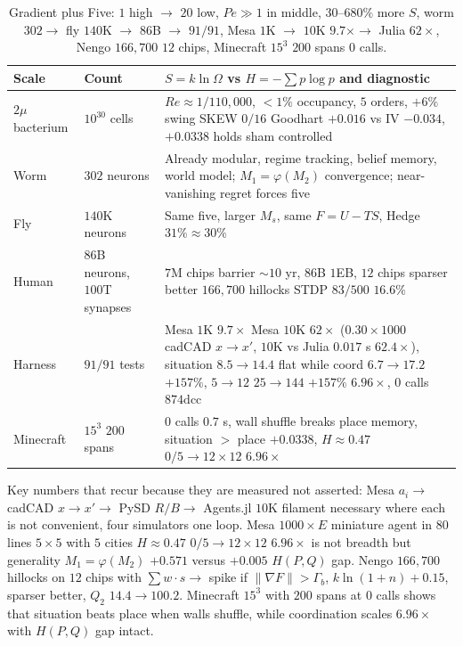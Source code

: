 \documentclass[11pt,a4paper]{article}
\begin{document}
\begin{table}[h]
\centering
\caption{Gradient plus Five: $1$ high $\to$ $20$ low, $Pe \gg 1$ in middle, $30$--$680\%$ more $S$, worm $302 \to$ fly $140$K $\to$ $86$B $\to$ $91/91$, Mesa $1$K $\to$ $10$K $9.7\times \to$ Julia $62\times$, Nengo $166{,}700$ $12$ chips, Minecraft $15^3$ $200$ spans $0$ calls.}
\label{tab:gradient}
\small
\begin{tabular}{p{4.2cm} p{3.2cm} p{6.5cm}}
\toprule
Scale & Count & $S = k\ln\Omega$ vs $H=-\sum p\log p$ and diagnostic \\
\midrule
$2\mu$ bacterium & $10^{30}$ cells & $Re \approx 1/110{,}000$, $<1\%$ occupancy, $5$ orders, $+6\%$ swing SKEW $0/16$ Goodhart $+0.016$ vs IV $-0.034$, $+0.0338$ holds sham controlled \\
\midrule
Worm & $302$ neurons & Already modular, regime tracking, belief memory, world model; $M_1=\varphi(M_2)$ convergence; near-vanishing regret forces five \\
\midrule
Fly & $140$K neurons & Same five, larger $M_s$, same $F=U-TS$, Hedge $31\%\approx 30\%$ \\
\midrule
Human & $86$B neurons, $100$T synapses & $7$M chips barrier $\sim 10$ yr, $86$B $1$EB, $12$ chips sparser better $166{,}700$ hillocks STDP $83/500$ $16.6\%$ \\
\midrule
Harness & $91/91$ tests & Mesa $1$K $9.7\times$ Mesa $10$K $62\times$ ($0.30\times1000$ cadCAD $x\to x'$, $10$K vs Julia $0.017$ s $62.4\times$), situation $8.5\to14.4$ flat while coord $6.7\to17.2$ $+157\%$, $5\to12$ $25\to144$ $+157\%$ $6.96\times$, $0$ calls $874\text{dcc}$ \\
\midrule
Minecraft & $15^3$ $200$ spans & $0$ calls $0.7$ s, wall shuffle breaks place memory, situation $>$ place $+0.0338$, $H\approx0.47$ $0/5\to12\times12$ $6.96\times$ \\
\bottomrule
\end{tabular}
\end{table}

Key numbers that recur because they are measured not asserted: Mesa $a_i \to$ cadCAD $x\to x' \to$ PySD $R/B \to$ Agents.jl $10$K filament necessary where each is not convenient, four simulators one loop. Mesa $1000\times E$ miniature agent in $80$ lines $5\times5$ with $5$ cities $H \approx 0.47$ $0/5 \to 12\times12$ $6.96\times$ is not breadth but generality $M_1=\varphi(M_2)$ $+0.571$ versus $+0.005$ $H(P,Q)$ gap. Nengo $166{,}700$ hillocks on $12$ chips with $\sum w\cdot s \to$ spike if $\|\nabla F\| > \Gamma_b$, $k\ln(1+n)+0.15$, sparser better, $Q_2$ $14.4 \to 100.2$. Minecraft $15^3$ with $200$ spans at $0$ calls shows that situation beats place when walls shuffle, while coordination scales $6.96\times$ with $H(P,Q)$ gap intact.
\end{document}
